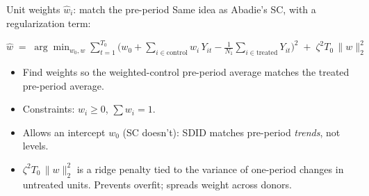 \documentclass[aspectratio=169,11pt]{beamer}
\begin{document}

\begin{frame}{Unit weights $\widehat{w}_i$: match the pre-period}
\vspace{0.5em}
Same idea as Abadie's SC, with a regularization term:
\vspace{0.2em}
\begin{center}\small
$\widehat{w} \;=\; \displaystyle\arg\min_{w_0, w} \sum_{t=1}^{T_0}\big(w_0 + \textstyle\sum_{i \in \text{control}} w_i\, Y_{it} - \frac{1}{N_1}\sum_{i \in \text{treated}} Y_{it}\big)^2 \;+\; \zeta^2 T_0\, \|w\|_2^2$
\end{center}

\vspace{0.7em}
\begin{itemize}\small
  \item Find weights so the weighted-control pre-period average matches the treated pre-period average.
  \item Constraints: $w_i \geq 0$, $\sum w_i = 1$.
  \item Allows an intercept $w_0$ (SC doesn't): SDID matches pre-period \textit{trends}, not levels.
  \item $\zeta^2 T_0\,\|w\|_2^2$ is a ridge penalty tied to the variance of one-period changes in untreated units. \;Prevents overfit; spreads weight across donors.
\end{itemize}
\end{frame}
\end{document}
